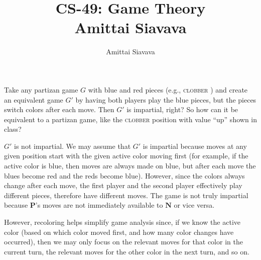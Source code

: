 \documentclass[11pt, reqno]{amsart}
\begin{document}

\title{CS-49: Game Theory\\ Amittai Siavava \\ }
\author{Amittai Siavava}


\setlength{\headheight}{13.0pt}
\setlength{\footskip}{15.0pt}

\maketitle

\bigskip

\def \cram { \textsc{cram} }
\def \dom { \textsc{domineering} }
\def \sub { \textsc{subtraction} }
\def \weighted { \textsc{weighted odds and evens}}
\def \nim { \textsc{nim} }
\def \P { \mathbf{P}}
\def \N { \mathbf{N}}
\def \cc { \mathbf{cc} }
\def \hackenbush { \textsc{LR hackenbush} }
\def \clobber { \textsc{clobber} }

\newpage
  \begin{problem}[21]
    Take any partizan game $G$ with blue and red pieces (e.g., \clobber)
    and create an equivalent game $G'$ by having both players play the blue pieces,
    but the pieces switch colors after each move.
    Then $G'$ is impartial, right?
    So how can it be equivalent to a partizan game, like the \clobber position
    with value ``up'' shown in class?

    \step
    $G'$ is not impartial.
    We may assume that $G'$ is impartial because moves at any given position
    start with the given active color moving first
    (for example, if the active color is blue, then moves are always made on blue,
    but after each move the blues become red and the reds become blue).
    However, since the colors always change after each move, the first player
    and the second player effectively play different pieces, therefore
    have different moves.
    The game is not truly impartial because $\P$'s moves are not immediately
    available to $\N$ or vice versa.

    \step
    However, recoloring helps simplify game analysis since, if we know the active color
    (based on which color moved first, and how many color changes have occurred),
    then we may only focus on the relevant moves for that color in the current turn,
    the relevant moves for the other color in the next turn, and so on.
  \end{problem}
\end{document}

